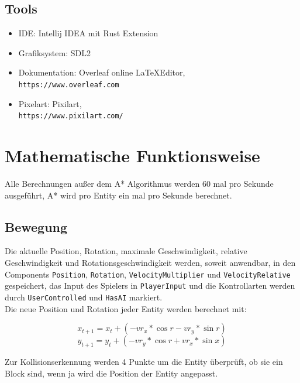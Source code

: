 \documentclass[a4paper,titlepage]{article}
\begin{document}
    \subsection{Tools}
    
    \begin{itemize}
        \item IDE: Intellij IDEA mit Rust Extension
        \item Grafiksystem: SDL2
        \item Dokumentation: Overleaf online \LaTeX Editor, \\
        \verb|https://www.overleaf.com|
        \item Pixelart: Pixilart, \\
        \verb|https://www.pixilart.com/|
    \end{itemize}
    
    
    \newpage
    
    \section{Mathematische Funktionsweise}
    
    Alle Berechnungen außer dem A* Algorithmus werden 60 mal pro Sekunde ausgeführt, A* wird pro Entity ein mal pro Sekunde berechnet.
    
    \subsection{Bewegung}
    
    Die aktuelle Position, Rotation, maximale Geschwindigkeit, relative Geschwindigkeit und Rotationsgeschwindigkeit werden, soweit anwendbar, in den Components \verb|Position|, \verb|Rotation|, \verb|VelocityMultiplier| und \verb|VelocityRelative| gespeichert, das Input des Spielers in \verb|PlayerInput| und die Kontrollarten werden durch \verb|UserControlled| und \verb|HasAI| markiert. \\
    
    Die neue Position und Rotation jeder Entity werden berechnet mit:
    
    $$x_{t+1} = x_t + (-vr_x*\cos{r} - vr_y*\sin{r})$$
    $$y_{t+1} = y_t + (-vr_y*\cos{r} + vr_x*\sin{x})$$
    
    Zur Kollisionserkennung werden 4 Punkte um die Entity überprüft, ob sie ein Block sind, wenn ja wird die Position der Entity angepasst.
    
\end{document}
